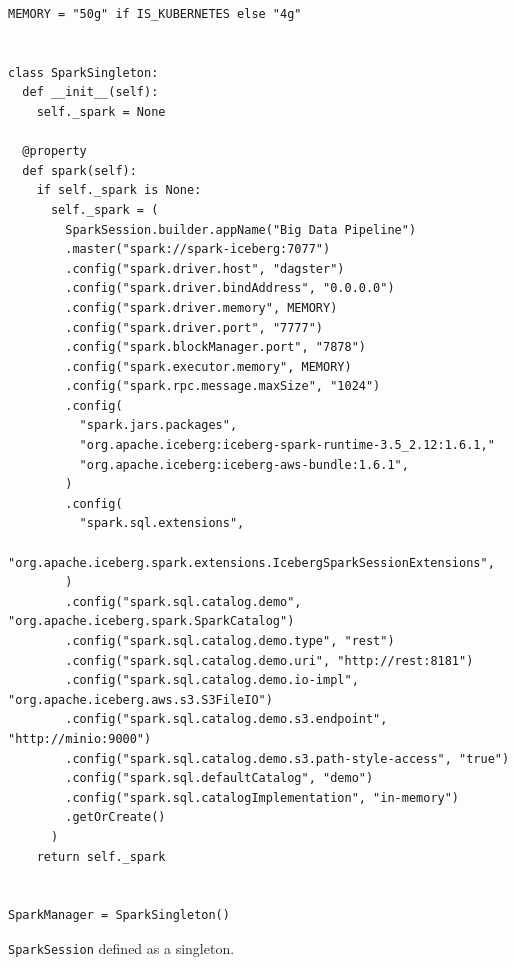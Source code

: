 \begin{listing}[H]
\begin{verbatim}
MEMORY = "50g" if IS_KUBERNETES else "4g"


class SparkSingleton:
  def __init__(self):
    self._spark = None

  @property
  def spark(self):
    if self._spark is None:
      self._spark = (
        SparkSession.builder.appName("Big Data Pipeline")
        .master("spark://spark-iceberg:7077")
        .config("spark.driver.host", "dagster")
        .config("spark.driver.bindAddress", "0.0.0.0")
        .config("spark.driver.memory", MEMORY)
        .config("spark.driver.port", "7777")
        .config("spark.blockManager.port", "7878")
        .config("spark.executor.memory", MEMORY)
        .config("spark.rpc.message.maxSize", "1024")
        .config(
          "spark.jars.packages",
          "org.apache.iceberg:iceberg-spark-runtime-3.5_2.12:1.6.1,"
          "org.apache.iceberg:iceberg-aws-bundle:1.6.1",
        )
        .config(
          "spark.sql.extensions",
          "org.apache.iceberg.spark.extensions.IcebergSparkSessionExtensions",
        )
        .config("spark.sql.catalog.demo", "org.apache.iceberg.spark.SparkCatalog")
        .config("spark.sql.catalog.demo.type", "rest")
        .config("spark.sql.catalog.demo.uri", "http://rest:8181")
        .config("spark.sql.catalog.demo.io-impl", "org.apache.iceberg.aws.s3.S3FileIO")
        .config("spark.sql.catalog.demo.s3.endpoint", "http://minio:9000")
        .config("spark.sql.catalog.demo.s3.path-style-access", "true")
        .config("spark.sql.defaultCatalog", "demo")
        .config("spark.sql.catalogImplementation", "in-memory")
        .getOrCreate()
      )
    return self._spark


SparkManager = SparkSingleton()
\end{verbatim}
\caption{\texttt{SparkSession} defined as a singleton.}
\label{lst:dagster-utility-spark}
\end{listing}

